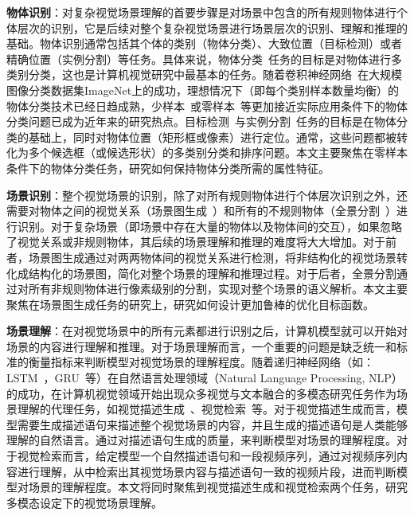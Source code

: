 \begin{asparaenum}
\item \textbf{物体识别}：对复杂视觉场景理解的首要步骤是对场景中包含的所有规则物体进行个体层次的识别，它是后续对整个复杂视觉场景进行场景层次的识别、理解和推理的基础。物体识别通常包括其个体的类别（物体分类）、大致位置（目标检测）或者精确位置（实例分割）等任务。具体来说，物体分类~\cite{russakovsky2015imagenet}任务的目标是对物体进行多类别分类，这也是计算机视觉研究中最基本的任务。随着卷积神经网络~\cite{krizhevsky2012imagenet}在大规模图像分类数据集ImageNet上的成功，理想情况下（即每个类别样本数量均衡）的物体分类技术已经日趋成熟，少样本~\cite{fei2006one}或零样本~\cite{lampert2009learning}等更加接近实际应用条件下的物体分类问题已成为近年来的研究热点。目标检测~\cite{ren2015faster}与实例分割~\cite{he2017mask}任务的目标是在物体分类的基础上，同时对物体位置（矩形框或像素）进行定位。通常，这些问题都被转化为多个候选框（或候选形状）的多类别分类和排序问题。本文主要聚焦在零样本条件下的物体分类任务，研究如何保持物体分类所需的属性特征。


\item \textbf{场景识别}：整个视觉场景的识别，除了对所有规则物体进行个体层次识别之外，还需要对物体之间的视觉关系（场景图生成~\cite{johnson2015image}）和所有的不规则物体（全景分割~\cite{kirillov2019panoptic}）进行识别。对于复杂场景（即场景中存在大量的物体以及物体间的交互），如果忽略了视觉关系或非规则物体，其后续的场景理解和推理的难度将大大增加。对于前者，场景图生成通过对两两物体间的视觉关系进行检测，将非结构化的视觉场景转化成结构化的场景图，简化对整个场景的理解和推理过程。对于后者，全景分割通过对所有非规则物体进行像素级别的分割，实现对整个场景的语义解析。本文主要聚焦在场景图生成任务的研究上，研究如何设计更加鲁棒的优化目标函数。


\item \textbf{场景理解}：在对视觉场景中的所有元素都进行识别之后，计算机模型就可以开始对场景的内容进行理解和推理。对于场景理解而言，一个重要的问题是缺乏统一和标准的衡量指标来判断模型对视觉场景的理解程度。随着递归神经网络（如：LSTM~\cite{hochreiter1997long}，GRU~\cite{chung2014empirical}等）在自然语言处理领域（Natural Language Processing, NLP）的成功，在计算机视觉领域开始出现众多视觉与文本融合的多模态研究任务作为场景理解的代理任务，如视觉描述生成~\cite{vinyals2015show}、视觉检索~\cite{gao2017tall}等。对于视觉描述生成而言，模型需要生成描述语句来描述整个视觉场景的内容，并且生成的描述语句是人类能够理解的自然语言。通过对描述语句生成的质量，来判断模型对场景的理解程度。对于视觉检索而言，给定模型一个自然描述语句和一段视频序列，通过对视频序列内容进行理解，从中检索出其视觉场景内容与描述语句一致的视频片段，进而判断模型对场景的理解程度。本文将同时聚焦到视觉描述生成和视觉检索两个任务，研究多模态设定下的视觉场景理解。



\end{asparaenum}
